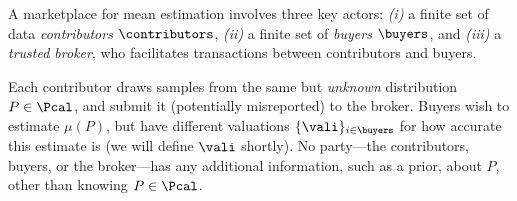 





A marketplace for mean estimation involves three key actors:  
\emph{(i)} a finite set of data \emph{contributors} $\contributors$,
\emph{(ii)} a finite set of \emph{buyers} $\buyers$,
and
\emph{(iii)} a \emph{trusted broker}, who facilitates transactions between contributors and buyers.  



Each contributor draws samples from the same but \emph{unknown} distribution $P \in \Pcal$, and submit it (potentially misreported) to the broker.
Buyers wish to estimate $\mu(P)$, but have different valuations $\{\vali\}_{i\in\buyers}$ for how accurate this estimate is (we will define $\vali$ shortly).
No party---the contributors, buyers, or the broker---has any additional information, such as a prior, about $P$, other than knowing $P \in \Pcal$.


